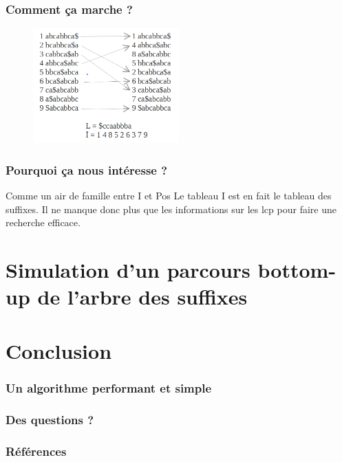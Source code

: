 \documentclass[10pt]{beamer}
\begin{document}
\begin{frame}
  \frametitle{Comment ça marche ?}
  \begin{figure}
    \includegraphics[width=0.5\textwidth]{full_burrows}
  \end{figure}

\end{frame}

\begin{frame}
  \frametitle{Pourquoi ça nous intéresse ?}

  \begin{block}{Comme un air de famille entre I et Pos}
    Le tableau I est en fait le tableau des suffixes.
    Il ne manque donc plus que les informations sur les lcp pour faire
    une recherche efficace.
  \end{block}

\end{frame}



\section{Simulation d'un parcours bottom-up de l'arbre des suffixes}
\label{sec:appbottomup}


\section{Conclusion}
\label{sec:conclusion}

\begin{frame}
  \frametitle{Un algorithme performant et simple}
\end{frame}

\begin{frame}
  \frametitle{Des questions ?}
\end{frame}

\begin{frame}
  \frametitle{Références}
  
  
\end{frame}
\end{document}
